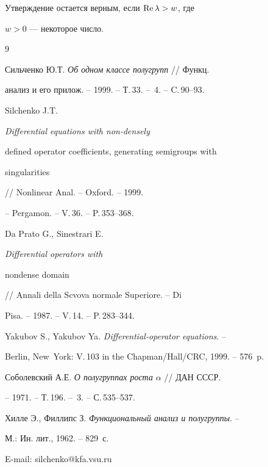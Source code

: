 \begin{notenonum}


Утверждение остается верным, если $\operatorname{Re}\lambda > w$, где


$w>0$ --- некоторое число.


\end{notenonum}








\begin{thebibliography}{9}





\bibitem{}


Сильченко Ю.Т. {\em Об одном классе полугрупп} // Функц.


анализ и его прилож. -- 1999. -- Т.\,33. -- \No\,4.  -- C.\,90--93.




Silchenko J.T. {\em Differential equations with non-densely


defined operator coefficients, generating semigroups with


singularities} // Nonlinear Anal. -- Oxford. -- 1999.


-- Pergamon. -- V.\,36. -- P.\,353--368.




Da Prato G., Sinestrari E. {\em Differential operators with


nondense domain} // Annali della Scvova normale Superiore. -- Di


Pisa. -- 1987. -- V.\,14. -- P.\,283--344.




Yakubov S., Yakubov Ya. {\em Differential-operator equations}. --


Berlin, New~York: V.\,103 in the Chapman/Hall/CRC, 1999. -- 576~p.




Соболевский А.Е. {\em О полугруппах роста $\alpha$} // ДАН СССР.


-- 1971. -- Т.\,196. -- \No\,3. -- С.\,535--537.




Хилле Э., Филлипс З. {\em Функциональный анализ и полугруппы}. --


М.: Ин. лит., 1962. -- 829~с.





\end{thebibliography}





\vskip 2cm












\label{end}








E-mail: silchenko@kfa.vsu.ru








